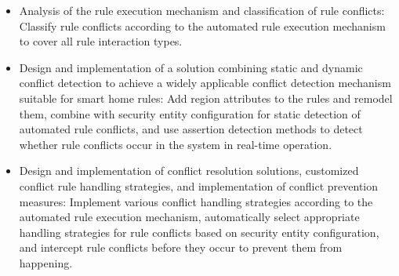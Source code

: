\begin{itemize}
	\item Analysis of the rule execution mechanism and classification of rule conflicts: Classify rule conflicts according to the automated rule execution mechanism to cover all rule interaction types.
	\item Design and implementation of a solution combining static and dynamic conflict detection to achieve a widely applicable conflict detection mechanism suitable for smart home rules: Add region attributes to the rules and remodel them, combine with security entity configuration for static detection of automated rule conflicts, and use assertion detection methods to detect whether rule conflicts occur in the system in real-time operation.
	\item Design and implementation of conflict resolution solutions, customized conflict rule handling strategies, and implementation of conflict prevention measures: Implement various conflict handling strategies according to the automated rule execution mechanism, automatically select appropriate handling strategies for rule conflicts based on security entity configuration, and intercept rule conflicts before they occur to prevent them from happening.
\end{itemize}
